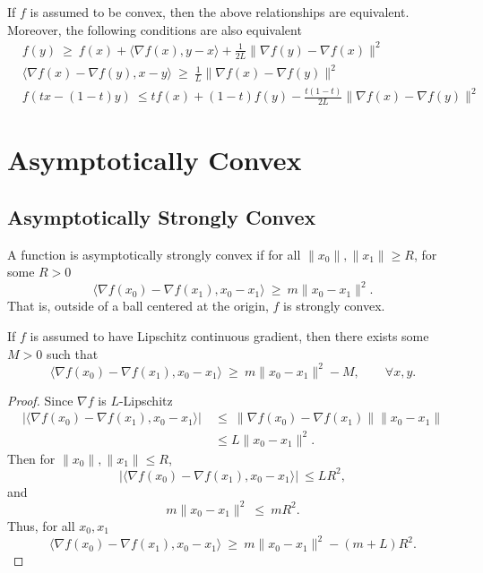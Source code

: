 \documentclass{article}
\begin{document}
If $f$ is assumed to be convex, then the above relationships are equivalent. Moreover, the following conditions are also equivalent
\begin{align}
    &f(y)\ \geq\ f(x) + \langle \nabla f(x), y-x\rangle + \frac{1}{2L}\|\nabla f(y) - \nabla f(x)\|^2\\
    &\langle \nabla f(x) - \nabla f(y), x-y\rangle\ \geq\ \frac{1}{L}\|\nabla f(x) - \nabla f(y)\|^2\\
    &f(tx - (1-t)y)\ \leq tf(x) + (1-t)f(y) - \frac{t(1-t)}{2L}\|\nabla f(x) - \nabla f(y)\|^2
\end{align}


\newpage
\section{Asymptotically Convex}
\subsection{Asymptotically Strongly Convex}
A function is asymptotically strongly convex if for all $\|x_0\|, \|x_1\|\geq R$, for some $R>0$
\begin{equation}
    \langle \nabla f(x_0) - \nabla f(x_1), x_0 - x_1\rangle\ \geq\ m\|x_0 - x_1\|^2.
\end{equation}
That is, outside of a ball centered at the origin, $f$ is strongly convex.

If $f$ is assumed to have Lipschitz continuous gradient, then there exists some $M>0$ such that
\begin{equation}
    \langle \nabla f(x_0) - \nabla f(x_1), x_0 - x_1\rangle\ \geq\ m\|x_0-x_1\|^2 - M,\qquad\forall x,y.
\end{equation}
\begin{proof}
    Since $\nabla f$ is $L$-Lipschitz
    \begin{align}
        |\langle \nabla f(x_0) - \nabla f(x_1), x_0 - x_1\rangle|\ &\leq\ \|\nabla f(x_0) - \nabla f(x_1)\|\|x_0 - x_1\|\\
        &\leq L\|x_0-x_1\|^2.
    \end{align}
    Then for $\|x_0\|, \|x_1\|\leq R$,
    \begin{equation}
        |\langle \nabla f(x_0) - \nabla f(x_1), x_0 - x_1\rangle|\ \leq LR^2,
    \end{equation}
    and
    \begin{equation}
        m\|x_0 - x_1\|^2\ \leq\ mR^2.
    \end{equation}
    Thus, for all $x_0, x_1$
    \begin{equation}
        \langle \nabla f(x_0) - \nabla f(x_1), x_0 - x_1\rangle\ \geq\ m\|x_0-x_1\|^2 - (m+L)R^2.
    \end{equation}
    
\end{proof}
\end{document}
